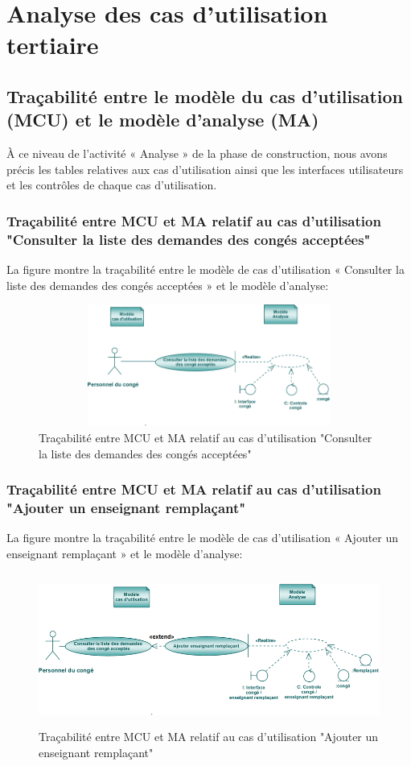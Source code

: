 \documentclass[12 pt ]{report}
\begin{document}
\section{Analyse des cas d’utilisation tertiaire }
\subsection{Traçabilité entre le modèle du cas d’utilisation (MCU) et le modèle d’analyse (MA)}
 À ce niveau de l’activité « Analyse » de la phase de construction, nous avons précis les tables relatives aux cas d’utilisation ainsi que les interfaces utilisateurs et les contrôles de chaque cas d’utilisation.
 \newpage
 \subsubsection{Traçabilité entre MCU et MA relatif au cas d’utilisation "Consulter la liste des demandes des congés acceptées"}
La figure  montre la traçabilité entre le modèle de cas d’utilisation « Consulter la liste des demandes des congés acceptées » et le modèle d’analyse:
\begin{figure}[h]
\begin{center}
\includegraphics[width= 14cm , height =4cm]{tra_con_con_jus.PNG}
\caption{Traçabilité entre MCU et MA relatif au cas d’utilisation "Consulter la liste des demandes des congés acceptées"}
\end{center}
\end{figure}
\subsubsection{Traçabilité entre MCU et MA relatif au cas d’utilisation "Ajouter un enseignant remplaçant"}
La figure  montre la traçabilité entre le modèle de cas d’utilisation « Ajouter un enseignant remplaçant » et le modèle d’analyse:
\begin{figure}[h]
\begin{center}
\includegraphics[width= 14cm , height =5cm]{tt.PNG}
\caption{Traçabilité entre MCU et MA relatif au cas d’utilisation "Ajouter un enseignant remplaçant"}
\end{center}
\end{figure}
\newpage
\end{document}
